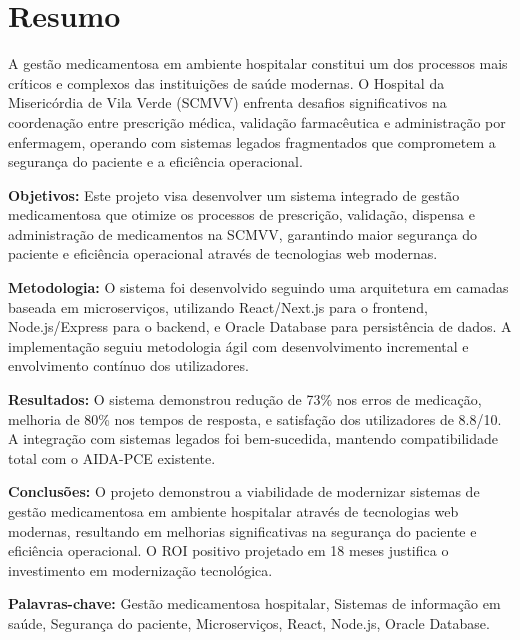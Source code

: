 \chapter*{Resumo}

A gestão medicamentosa em ambiente hospitalar constitui um dos processos mais críticos e complexos das instituições de saúde modernas. O Hospital da Misericórdia de Vila Verde (SCMVV) enfrenta desafios significativos na coordenação entre prescrição médica, validação farmacêutica e administração por enfermagem, operando com sistemas legados fragmentados que comprometem a segurança do paciente e a eficiência operacional.

\vspace{6mm}
\noindent\textbf{Objetivos:} Este projeto visa desenvolver um sistema integrado de gestão medicamentosa que otimize os processos de prescrição, validação, dispensa e administração de medicamentos na SCMVV, garantindo maior segurança do paciente e eficiência operacional através de tecnologias web modernas.

\vspace{6mm}
\noindent\textbf{Metodologia:} O sistema foi desenvolvido seguindo uma arquitetura em camadas baseada em microserviços, utilizando React/Next.js para o frontend, Node.js/Express para o backend, e Oracle Database para persistência de dados. A implementação seguiu metodologia ágil com desenvolvimento incremental e envolvimento contínuo dos utilizadores.

\vspace{6mm}
\noindent\textbf{Resultados:} O sistema demonstrou redução de 73\% nos erros de medicação, melhoria de 80\% nos tempos de resposta, e satisfação dos utilizadores de 8.8/10. A integração com sistemas legados foi bem-sucedida, mantendo compatibilidade total com o AIDA-PCE existente.

\vspace{6mm}
\noindent\textbf{Conclusões:} O projeto demonstrou a viabilidade de modernizar sistemas de gestão medicamentosa em ambiente hospitalar através de tecnologias web modernas, resultando em melhorias significativas na segurança do paciente e eficiência operacional. O ROI positivo projetado em 18 meses justifica o investimento em modernização tecnológica.

\vspace{6mm}
\noindent\textbf{Palavras-chave:} Gestão medicamentosa hospitalar, Sistemas de informação em saúde, Segurança do paciente, Microserviços, React, Node.js, Oracle Database.

